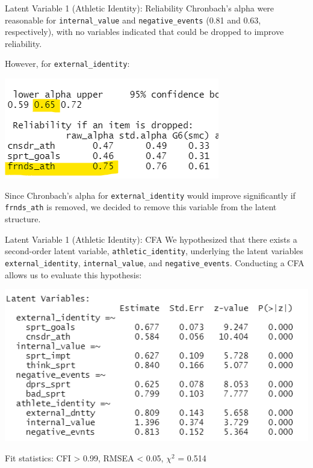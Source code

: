 \documentclass[
  ignorenonframetext,
]{beamer}
\begin{document}
\begin{frame}[fragile]{Latent Variable 1 (Athletic Identity):
Reliability}
\protect\hypertarget{latent-variable-1-athletic-identity-reliability}{}
Chronbach's alpha were reasonable for \texttt{internal\_value} and
\texttt{negative\_events} (0.81 and 0.63, respectively), with no
variables indicated that could be dropped to improve reliability.

However, for \texttt{external\_identity}:

\centering

\includegraphics{images/athletic_identity_alpha.png}

Since Chronbach's alpha for \texttt{external\_identity} would improve
significantly if \texttt{frnds\_ath} is removed, we decided to remove
this variable from the latent structure.
\end{frame}

\begin{frame}[fragile]{Latent Variable 1 (Athletic Identity): CFA}
\protect\hypertarget{latent-variable-1-athletic-identity-cfa}{}
We hypothesized that there exists a second-order latent variable,
\texttt{athletic\_identity}, underlying the latent variables
\texttt{external\_identity}, \texttt{internal\_value}, and
\texttt{negative\_events}. Conducting a CFA allows us to evaluate this
hypothesis:

\centering

\includegraphics{images/athletic_identity_cfa.png}

Fit statistics: CFI \textgreater{} 0.99, RMSEA \textless{} 0.05,
\(\chi^2\) = 0.514
\end{frame}
\end{document}
